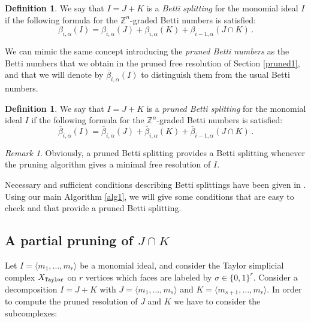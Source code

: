 \documentclass[12pt]{amsart}
\theoremstyle{definition}
\newtheorem{definition}[theorem]{Definition}
\theoremstyle{remark}
\newtheorem{remark}[theorem]{Remark}
\numberwithin{equation}{section}
\newcommand{\bZ}{{\mathbb{Z}}}
\begin{document}
\begin{definition}
We say that $I=J+K$ is a {\it Betti splitting} for the monomial ideal $I$ if
the following formula for the $\bZ^n$-graded Betti numbers is satisfied:
 $$\beta_{i,\alpha}(I)= \beta_{i,\alpha}(J)+\beta_{i,\alpha}(K)+\beta_{i-1,\alpha}(J\cap
K)\,.$$
\end{definition}

We can mimic the same concept introducing the {\it pruned Betti numbers} as
the Betti numbers that we obtain in the pruned free resolution of
Section \ref{pruned1}, and  that we will  denote by
$\overline{\beta}_{i,\alpha}(I)$ to distinguish them from the usual Betti
numbers.

\begin{definition}
We say that $I=J+K$ is a {\it pruned Betti splitting} for the monomial ideal $I$ if
the following formula for the $\bZ^n$-graded Betti numbers is satisfied:
 $$\overline{\beta}_{i,\alpha}(I)= \overline{\beta}_{i,\alpha}(J)+\overline{\beta}_{i,\alpha}(K)+\overline{\beta}_{i-1,\alpha}(J\cap
K)\,.$$
\end{definition}

\vskip 2mm

\begin{remark}
Obviously, a pruned Betti splitting provides a Betti splitting
whenever the pruning algorithm gives a minimal free resolution
of $I$.
\end{remark}

\vskip 2mm

Necessary and sufficient conditions describing Betti splittings
have been given in \cite{FHV}. Using our main Algorithm \ref{alg1},
we will give some conditions that are easy to check and that provide a pruned Betti
splitting.


\subsection{A partial pruning of $J\cap K$}

Let $I=\langle m_1,\dots,m_r \rangle$ be a monomial ideal, and consider the Taylor
simplicial complex $X_{\tt Taylor}$ on $r$ vertices which
faces are labeled by $\sigma \in \{0,1\}^r$. Consider a
decomposition $I=J+K$ with $J=\langle m_1,\dots,m_s \rangle$ and $K=
\langle m_{s+1},\dots,m_r \rangle$. In order to compute the pruned
resolution of $J$ and $K$ we have to consider the subcomplexes:

\vskip 2mm
\end{document}
